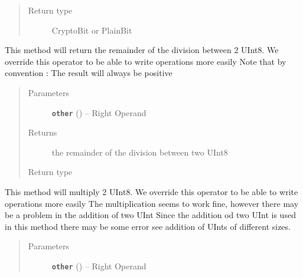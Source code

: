 \documentclass[letterpaper,10pt,english]{sphinxmanual}
\begin{document}
\begin{fulllineitems}
\begin{fulllineitems}
\begin{quote}
\begin{description}
\item[{Return type}] \leavevmode
CryptoBit or PlainBit

\end{description}\end{quote}

\end{fulllineitems}


\begin{fulllineitems}
\label{datatypes.integers:datatypes.integers.UInt8.UInt8.__mod__}
This method will return the remainder of the division between 2 UInt8.
We override this operator to be able to write operations more easily
Note that by convention : The result will always be positive
\begin{quote}\begin{description}
\item[{Parameters}] \leavevmode
\textbf{\texttt{other}} ({\hyperref[datatypes.integers:datatypes.integers.UInt8.UInt8]{}}) -- Right Operand

\item[{Returns}] \leavevmode
the remainder of the division between two UInt8

\item[{Return type}] \leavevmode
{\hyperref[datatypes.integers:datatypes.integers.UInt8.UInt8]{}}

\end{description}\end{quote}

\end{fulllineitems}


\begin{fulllineitems}
\label{datatypes.integers:datatypes.integers.UInt8.UInt8.__mul__}
This method will multiply 2 UInt8.
We override this operator to be able to write operations more easily
The multiplication seems to work fine, however there may be a problem in the addition of two UInt
Since the addition od two UInt is used in this method there may be some error
see addition of UInts of different sizes.
\begin{quote}\begin{description}
\item[{Parameters}] \leavevmode
\textbf{\texttt{other}} ({\hyperref[datatypes.integers:datatypes.integers.UInt8.UInt8]{}}) -- Right Operand


\end{description}
\end{quote}
\end{fulllineitems}
\end{fulllineitems}
\end{document}

